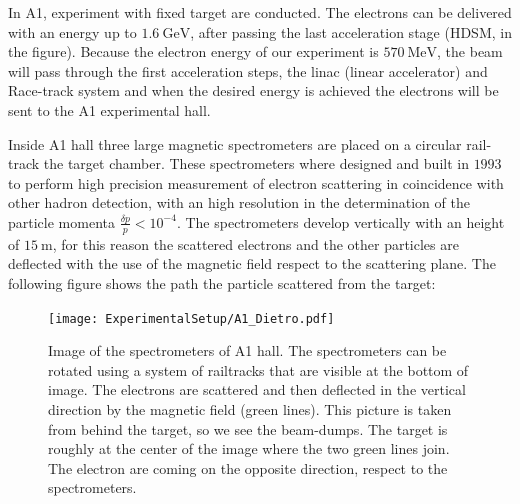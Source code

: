 In A1, experiment with fixed target are conducted. The electrons can be delivered with an energy up to $\SI{1.6}{\giga \electronvolt}$, after passing the last acceleration stage (HDSM, in the figure). Because the electron energy of our experiment is $\SI{570}{\mega \electronvolt}$, the beam will pass through the first acceleration steps, the linac (linear accelerator) and Race-track system and when the desired energy is achieved the electrons will be sent to the A1 experimental hall. \medskip

Inside A1 hall three large magnetic spectrometers are placed on a circular rail-track the target chamber. These spectrometers where designed and built in $1993$ to perform high precision measurement of electron scattering in coincidence with other hadron detection, with an high resolution in the determination of the particle momenta $\frac{\delta p}{p} < 10^{-4}$. The spectrometers develop vertically with an height of $\SI{15}{\meter}$, for this reason the scattered electrons and the other particles are deflected with the use of the magnetic field respect to the scattering plane. The following figure shows the path the particle scattered from the target:

\begin{figure}
\centering
\caption{Image of the spectrometers of A1 hall. The spectrometers can be rotated using a system of railtracks that are visible at the bottom of image. The electrons are scattered and then deflected in the vertical direction by the magnetic field (green lines). This picture is taken from behind the target, so we see the beam-dumps. The target is roughly at the center of the image where the two green lines join. The electron are coming on the opposite direction, respect to the spectrometers.}\label{fig:TwoDetectors}
\texttt{[image: ExperimentalSetup/A1\_Dietro.pdf]}
\end{figure}


